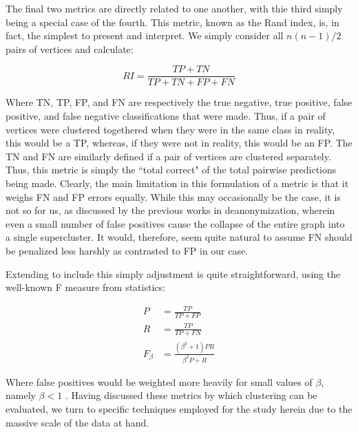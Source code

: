 \documentclass[journal]{IEEEtran}
\begin{document}
The final two metrics are directly related to one another, with thie third simply being a special case of the fourth. This metric, known as the Rand index, is, in fact, the simplest to present and interpret. We simply consider all $n(n-1)/2$ pairs of vertices and calculate:

$$ RI = \frac{TP + TN}{TP + TN + FP + FN} $$

Where TN, TP, FP, and FN are respectively the true negative, true positive, false positive, and false negative classifications that were made. Thus, if a pair of vertices were clustered togethered when they were in the same class in reality, this would be a TP, whereas, if they were not in reality, this would be an FP. The TN and FN are similarly defined if a pair of vertices are clustered separately. Thus, this metric is simply the ``total correct" of the total pairwise predictions being made. Clearly, the main limitation in this formulation of a metric is that it weighs FN and FP errors equally. While this may occasionally be the case, it is not so for us, as discussed by the previous works in deanonymization, wherein even a small number of false positives cause the collapse of the entire graph into a single supercluster. It would, therefore, seem quite natural to assume FN should be penalized less harshly as contrasted to FP in our case.

Extending to include this simply adjustment is quite straightforward, using the well-known F measure from statistics:

\begin{align}
P &= \frac{TP}{TP+FP} \\
R &= \frac{TP}{TP+FN} \\
F_{\beta} &= \frac{(\beta^2+1)PR}{\beta^2 P+R}
\end{align}

Where false positives would be weighted more heavily for small values of $\beta$, namely $\beta<1$ \cite{evaluation}. Having discussed these metrics by which clustering can be evaluated, we turn to specific techniques employed for the study herein due to the massive scale of the data at hand.
\end{document}
